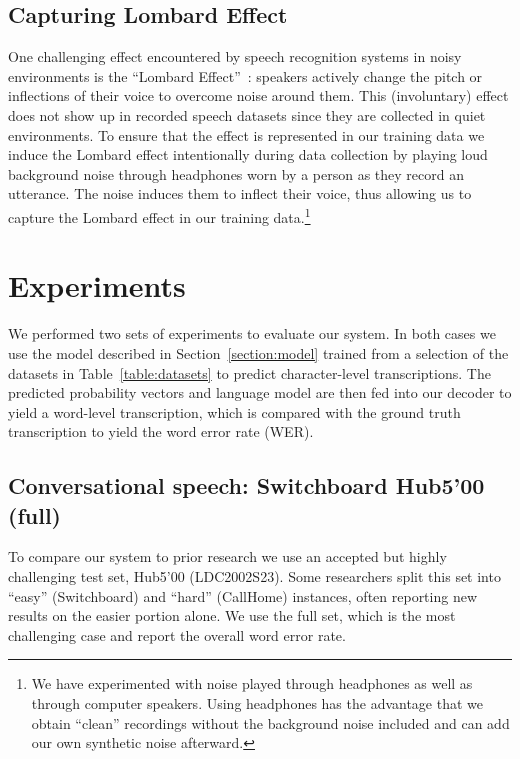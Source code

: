 \documentclass{article}
\begin{document}
\subsection{Capturing Lombard Effect}
\label{section:lombard}
One challenging effect encountered by speech recognition systems in noisy
environments is the ``Lombard Effect''~\cite{junqua1993lombard}:  
speakers actively change the pitch or inflections of their voice to overcome noise around them.  This
(involuntary) effect does not show up in recorded speech datasets since
they are collected in quiet environments.  To ensure that the effect is represented in our training data we induce the Lombard effect intentionally during data collection by playing loud background noise through headphones worn by a person as they record an utterance.  The noise induces them to inflect their voice, thus allowing us to capture the Lombard effect in our training data.\footnote{We 
have experimented with noise played through headphones as well as through computer speakers.  Using headphones has the advantage that we obtain ``clean'' recordings
without the background noise included and can add our own synthetic noise afterward.}

\section{Experiments}
\label{section:experiments}

We performed two sets of experiments to evaluate our system.  In both cases we
use the model described in Section~\ref{section:model} trained from a selection
of the datasets in Table~\ref{table:datasets} to predict character-level
transcriptions.  The predicted probability vectors and language model are then
fed into our decoder to yield a word-level transcription, which is compared
with the ground truth transcription to yield the word error rate (WER).

\subsection{Conversational speech:  Switchboard Hub5'00 (full)}
To compare our system to prior research we use an accepted but highly
challenging test set, Hub5'00 (LDC2002S23).  Some researchers split this set
into ``easy'' (Switchboard) and ``hard'' (CallHome) instances, often reporting
new results on the easier portion alone.  We use the full set, which is the
most challenging case and report the overall word error rate.
\end{document}
